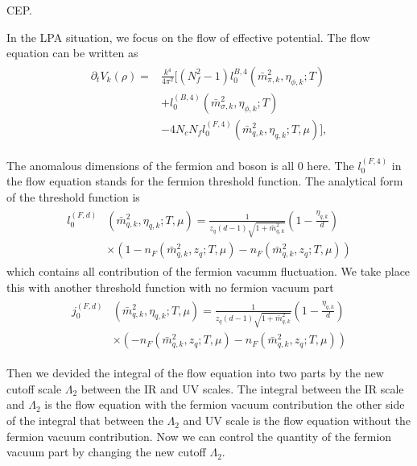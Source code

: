 \documentclass[%
reprint,
superscriptaddress,
showpacs,preprintnumbers,
 amsmath,amssymb,
 aps,
prl,
]{revtex4-1}
\begin{document}
CEP.\par In the LPA situation, we focus on the flow of effective potential. The flow equation can be written as
\begin{align}
\begin{split}
   \partial_t V_k(\rho)=&\frac{k^4}{4\pi^2}\big[(N^2_f-1)l^{B,4}_{0}(\bar{m}^2_{\pi,k},\eta_{\phi,k};T)\\
   &+l^{(B,4)}_{0}(\bar{m}^2_{\sigma,k},\eta_{\phi,k};T)\\
   &-4N_cN_fl^{(F,4)}_{0}(\bar{m}^2_{q,k},\eta_{q,k};T,\mu)\big],
\end{split}
\end{align}
\par The anomalous dimensions of the fermion and boson is all 0 here. The $l^{(F,4)}_{0}$ in the flow equation stands for the fermion threshold function. The analytical form of the threshold function is 
\begin{align}
\begin{split}
l^{(F,d)}_{0}&(\bar{m}^2_{q,k},\eta_{q,k};T,\mu)=\frac{1}{z_q(d-1)\sqrt{1+\bar{m}^2_{q,k}}}(1-\frac{\eta_{q,k}}{d})\\
&\times(1-n_F(\bar{m}^2_{q,k},z_q;T,\mu)-n_F(\bar{m}^2_{q,k},z_q;T,\mu))
\end{split}
\end{align}
which contains all contribution of the fermion vacumm fluctuation. We take place this with another threshold function with no fermion vacuum part 
\begin{align}
\begin{split}
j^{(F,d)}_{0}&(\bar{m}^2_{q,k},\eta_{q,k};T,\mu)=\frac{1}{z_q(d-1)\sqrt{1+\bar{m}^2_{q,k}}}(1-\frac{\eta_{q,k}}{d})\\
&\times(-n_F(\bar{m}^2_{q,k},z_q;T,\mu)-n_F(\bar{m}^2_{q,k},z_q;T,\mu))
\end{split}
\end{align}
\par Then we devided the integral of the flow equation into two parts by the new cutoff scale $\Lambda_2$ between the IR and UV scales. The integral between the IR scale and $\Lambda_2$ is the flow equation with the fermion vacuum contribution the other side of the integral that between the $\Lambda_2$ and UV scale is the flow equation without the fermion vacuum contribution. Now we can control the quantity of the fermion vacuum part by changing the new cutoff $\Lambda_2$.
\end{document}
